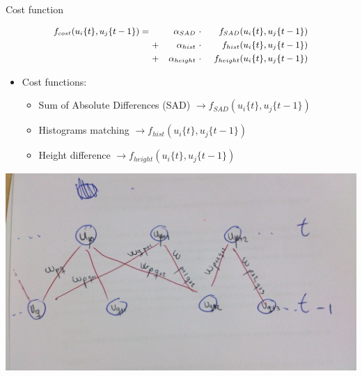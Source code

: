 \begin{frame}{Cost function}
  \begin{overlayarea}{\textwidth}{0.5\textheight}
  \begin{equation}
    \nonumber \small
    \begin{align*}
    f_{cost}(u_i\{t\}, u_j\{t - 1\}) =~  & & \alpha_{SAD} & ~\cdot~ & f_{SAD}(u_i\{t\}, u_j\{t - 1\}) \\
	& + & \alpha_{hist} & ~\cdot~ & f_{hist}(u_i\{t\}, u_j\{t - 1\}) \\
	& + & \alpha_{height} & ~\cdot~ & f_{height}(u_i\{t\}, u_j\{t - 1\})
    \end{align*}
  \end{equation}
  
  \begin{itemize}
   \item Cost functions:
    \begin{itemize}
      \item Sum of Absolute Differences (SAD) $\rightarrow f_{SAD}(u_i\{t\}, u_j\{t - 1\})$
      \item Histograms matching $\rightarrow f_{hist}(u_i\{t\}, u_j\{t - 1\})$
      \item Height difference $\rightarrow f_{height}(u_i\{t\}, u_j\{t - 1\})$
    \end{itemize}
  \end{itemize}
  \end{overlayarea}
  
  \vskip 1.0cm
  \begin{center}
    \includegraphics[height=0.2\textheight]{bipartite_graph}
  \end{center}
  

\end{frame}

